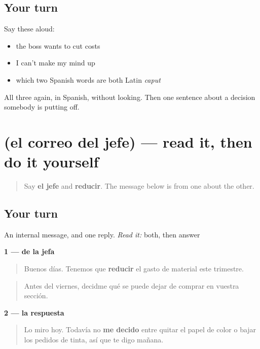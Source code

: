 \subsection*{Your turn}
Say these aloud:

\begin{itemize}
\raggedright
  \item the boss wants to cut costs
  \item I can't make my mind up
  \item which two Spanish words are both Latin \emph{caput}
\end{itemize}

\begin{tcolorbox}[breakable,colback=teal!4,colframe=teal!35!black,title={Before you move on}]
All three again, in Spanish, without looking. Then one sentence about a decision somebody is putting off.
\end{tcolorbox}
\section[Practice]{(el correo del jefe) — read it, then do it yourself}

\label{lesson:ES-C462-sintesis-jefe}



\begin{quote}
Say \textbf{el jefe} and \textbf{reducir}. The message below is from one about the other.
\end{quote}

\subsection*{Your turn}
An internal message, and one reply. \emph{Read it:} both, then answer

\textbf{1 — de la jefa}

\begin{quote}
Buenos días. Tenemos que \textbf{reducir} el gasto de material este trimestre.
\end{quote}

\begin{quote}
Antes del viernes, decidme qué se puede dejar de comprar en vuestra sección.
\end{quote}

\textbf{2 — la respuesta}

\begin{quote}
Lo miro hoy. Todavía no \textbf{me decido} entre quitar el papel de color o bajar los pedidos de tinta, así que te digo mañana.
\end{quote}


